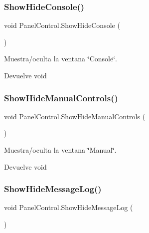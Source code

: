 \subsubsection{\texorpdfstring{ShowHideConsole()}{ShowHideConsole()}}
{\footnotesize\ttfamily void Panel\+Control.\+Show\+Hide\+Console (\begin{DoxyParamCaption}{ }\end{DoxyParamCaption})\hspace{0.3cm}{\ttfamily [inline]}}

Muestra/oculta la ventana \char`\"{}\+Console\char`\"{}. \begin{DoxyReturn}{Devuelve}
void 
\end{DoxyReturn}
\mbox{\label{class_panel_control_a1507903dbb7f0b7f49cb74b4b77247b2}} 
\subsubsection{\texorpdfstring{ShowHideManualControls()}{ShowHideManualControls()}}
{\footnotesize\ttfamily void Panel\+Control.\+Show\+Hide\+Manual\+Controls (\begin{DoxyParamCaption}{ }\end{DoxyParamCaption})\hspace{0.3cm}{\ttfamily [inline]}}

Muestra/oculta la ventana \char`\"{}\+Manual\char`\"{}. \begin{DoxyReturn}{Devuelve}
void 
\end{DoxyReturn}
\mbox{\label{class_panel_control_abd20147e23935b9f87a0b4508a2078c6}} 
\subsubsection{\texorpdfstring{ShowHideMessageLog()}{ShowHideMessageLog()}}
{\footnotesize\ttfamily void Panel\+Control.\+Show\+Hide\+Message\+Log (\begin{DoxyParamCaption}{ }\end{DoxyParamCaption})\hspace{0.3cm}{\ttfamily [inline]}}

